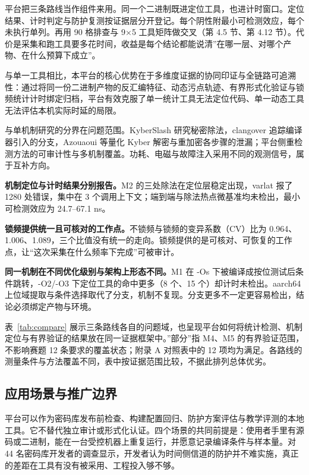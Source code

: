 平台把三条路线当作组件来用。同一个二进制既进定位工具，也进计时窗口。定位结果、计时判定与防护复测按证据层分开登记。每个阴性附最小可检测效应，每个未执行单列。再用 90 格排查与 9×5 工具矩阵做交叉（第 4.5 节、第 4.12 节）。代价是采集和跑工具要多花时间，收益是每个结论都能说清”在哪一层、对哪个产物、在什么预算下成立”。

与单一工具相比，本平台的核心优势在于多维度证据的协同印证与全链路可追溯性：通过将同一份二进制产物的反汇编特征、动态污点轨迹、有界形式化验证与锁频统计计时绑定归档，平台有效克服了单一统计工具无法定位代码、单一动态工具无法评估本机实际时延的局限。

与单机制研究的分界在问题范围。KyberSlash 研究秘密除法，clangover 追踪编译器引入的分支，Azouaoui 等量化 Kyber 解密与重加密各步骤的泄漏\cite{kyberslash,clangover,azouaoui2021}；平台侧重检测方法的可审计性与多机制覆盖。功耗、电磁与故障注入采用不同的观测信号，属于互补方向。

\textbf{机制定位与计时结果分别报告。}M2 的三处除法在定位层稳定出现，varlat 报了 1280 处错误，集中在 3 个调用上下文；端到端与除法热点微基准均未检出，最小可检测效应为 24.7--67.1 ns。%

\textbf{锁频提供统一且可核对的工作点。}不锁频与锁频的变异系数（CV）比为 0.964、1.006、1.089，三个比值没有统一的走向。锁频提供的是可核对、可恢复的工作点，让“这次采集在什么频率下完成”可被审计。%

\textbf{同一机制在不同优化级别与架构上形态不同。}M1 在 -Os 下被编译成按位测试后条件跳转，-O2/-O3 下定位工具的命中更多（8 个、15 个）却计时未检出。aarch64 上位域提取与条件选择取代了分支，机制不复现。分支更多不一定更容易检出，结论必须绑定产物与环境。%

表~\ref{tab:compare} 展示三条路线各自的问题域，也呈现平台如何将统计检测、机制定位与有界验证的结果放在同一证据框架中。”部分”指 M4、M5 的有界验证范围，不影响赛题 12 条要求的覆盖状态；附录 A 对照表中的 12 项均为满足。各路线的测量条件与方法覆盖不同，表中按证据范围比较，不据此排列总体优劣。

\subsection{应用场景与推广边界}

平台可以作为密码库发布前检查、构建配置回归、防护方案评估与教学评测的本地工具。它不替代独立审计或形式化认证。四个场景的共同前提是：使用者手里有源码或二进制，能在一台受控机器上重复运行，并愿意记录编译条件与样本量。对 44 名密码库开发者的调查显示，开发者认为时间侧信道的防护并不难实施，真正的差距在工具有没有被采用、工程投入够不够\cite{jancar2022}。

